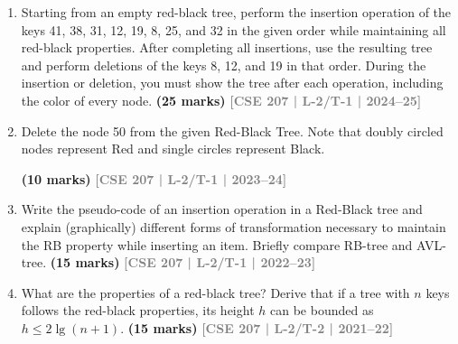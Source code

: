 \documentclass[12pt,a3paper]{article}
\newcommand{\yr}[1]{\hfill\textcolor{gray}{\small\textbf{[#1]}}}
\newcommand{\mk}[1]{\textcolor{orange!70!black}{\small\textbf{(#1 marks)}}}
\begin{document}
\begin{enumerate}

\item Starting from an empty red-black tree, perform the insertion operation of the keys 41, 38, 31, 12, 19, 8, 25, and 32 in the given order while maintaining all red-black properties. After completing all insertions, use the resulting tree and perform deletions of the keys 8, 12, and 19 in that order. During the insertion or deletion, you must show the tree after each operation, including the color of every node.
\mk{25} \yr{CSE 207 | L-2/T-1 | 2024--25}

\item Delete the node 50 from the given Red-Black Tree. Note that doubly circled nodes represent Red and single circles represent Black.
\begin{center}
\end{center}
\mk{10} \yr{CSE 207 | L-2/T-1 | 2023--24}

\item Write the pseudo-code of an insertion operation in a Red-Black tree and explain (graphically) different forms of transformation necessary to maintain the RB property while inserting an item. Briefly compare RB-tree and AVL-tree.
\mk{15} \yr{CSE 207 | L-2/T-1 | 2022--23}

\item What are the properties of a red-black tree? Derive that if a tree with $n$ keys follows the red-black properties, its height $h$ can be bounded as $h \leq 2\lg(n + 1)$.
\mk{15} \yr{CSE 207 | L-2/T-2 | 2021--22}


\end{enumerate}
\end{document}
